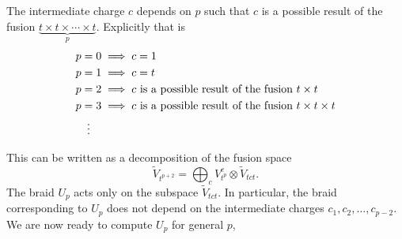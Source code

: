 \documentclass[a4paper,10pt,oneside]{book}
\theoremstyle{plain}
\theoremstyle{definition}
\theoremstyle{remark}
\begin{document}
The intermediate charge $c$ depends on $p$ such that $c$ is a possible result of the fusion $\underbrace{t \times t \times \cdots \times t}_{p}$. Explicitly that is
\begin{equation}
  \begin{aligned}
    p &= 0 \implies c = 1 \\
    p &= 1 \implies c = t \\
    p &= 2 \implies c \text{ is a possible result of the fusion } t \times t \\
    p &= 3 \implies c \text{ is a possible result of the fusion } t \times t \times t \\
    & \vdotswithin{=}
  \end{aligned}
\end{equation}

This can be written as a decomposition of the fusion space
\begin{equation}
  \widetilde{V}_{t^{p+2}} = \bigoplus_c V_{t^p}^c ⊗ \widetilde{V}_{tct}.
\end{equation}
The braid $U_p$ acts only on the subspace $\widetilde{V}_{tct}$. In particular, the braid corresponding to $U_p$ does not depend on the intermediate charges $c_1, c_2, \ldots, c_{p-2}$. We are now ready to compute $U_p$ for general $p$,
\end{document}
